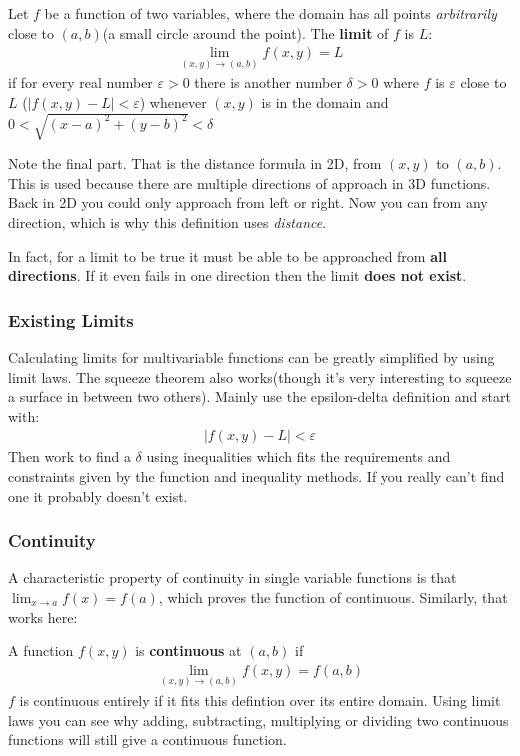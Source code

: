 \documentclass{article}
\begin{document}
Let $f$ be a function of two variables, where the domain has all points \textit{arbitrarily} close to $(a,b)$(a small circle around the point). The \textbf{limit} of $f$ is $L$:
\begin{gather*}
    \lim_{(x,y) \to (a,b)} f(x,y) = L
\end{gather*}
if for every real number $\varepsilon > 0$ there is another number $\delta > 0$ where $f$ is $\varepsilon$ close to $L$ ($|f(x,y) - L| < \varepsilon$) whenever $(x,y)$ is in the domain and $0 < \sqrt{(x-a)^2 + (y-b)^2} < \delta$

Note the final part. That is the distance formula in 2D, from $(x,y)$ to $(a,b)$. This is used because there are multiple directions of approach in 3D functions. Back in 2D you could only approach from left or right. Now you can from any direction, which is why this definition uses \textit{distance}.

In fact, for a limit to be true it must be able to be approached from \textbf{all directions}. If it even fails in one direction then the limit \textbf{does not exist}.
\subsubsection{Existing Limits}
Calculating limits for multivariable functions can be greatly simplified by using limit laws. The squeeze theorem also works(though it's very interesting to squeeze a surface in between two others). Mainly use the epsilon-delta definition and start with:
\begin{gather*}
    |f(x,y) - L| < \varepsilon
\end{gather*}
Then work to find a $\delta$ using inequalities which fits the requirements and constraints given by the function and inequality methods. If you really can't find one it probably doesn't exist.
\subsubsection{Continuity}
A characteristic property of continuity in single variable functions is that $\lim_{x \to a} f(x) = f(a)$, which proves the function of continuous. Similarly, that works here:

A function $f(x,y)$ is \textbf{continuous} at $(a,b)$ if
\begin{gather*}
    \lim_{(x,y) \to (a,b)} f(x,y) = f(a,b)
\end{gather*}
$f$ is continuous entirely if it fits this defintion over its entire domain. Using limit laws you can see why adding, subtracting, multiplying or dividing two continuous functions will still give a continuous function.
\end{document}
